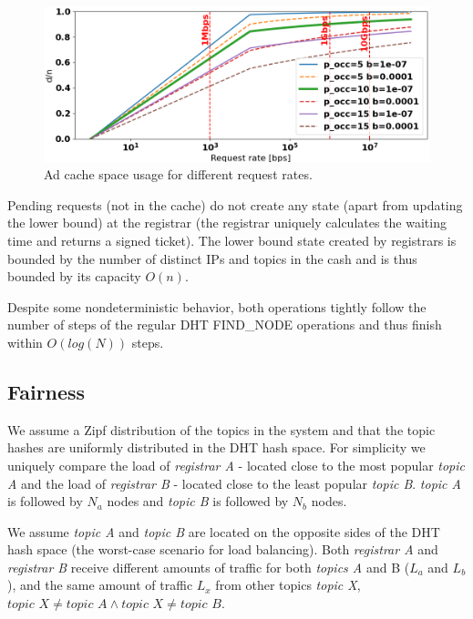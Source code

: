 \begin{figure}[t]
    \includegraphics[width=1\linewidth]{img/cache_size_limit}
    \vspace{-0.10in}
    \caption{Ad cache space usage for different request rates.
    }
    \label{fig:cache_size_limit}
    \vspace{-0.15in}
\end{figure}
Pending requests (\ie not in the cache) do not create any state (apart from updating the lower bound) at the registrar (\ie the registrar uniquely calculates the waiting time and returns a signed ticket). The lower bound state created by registrars is bounded by the number of distinct IPs and topics in the cash and is thus bounded by its capacity $O(n)$.

Despite some nondeterministic behavior, both operations tightly follow the number of steps of the regular DHT FIND\_NODE operations and thus finish within $O(log(N))$ steps.

\subsection{Fairness}
We assume a Zipf distribution of the topics in the system and that the topic hashes are uniformly distributed in the DHT hash space. For simplicity we uniquely compare the load of \emph{registrar A} - located close to the most popular \emph{topic A} and the load of \emph{registrar B} - located close to the least popular \emph{topic B}. \emph{topic A} is followed by $N_a$ nodes and \emph{topic B} is followed by $N_b$ nodes. 

We assume \emph{topic A} and \emph{topic B} are located on the opposite sides of the DHT hash space (the worst-case scenario for load balancing). Both \emph{registrar A} and \emph{registrar B} receive different amounts of traffic for both \emph{topics A} and {B} ($L_a$ and $L_b$), and the same amount of traffic $L_x$ from other topics \emph{topic X}, $\textit{topic X} \neq \textit{topic A} \land  \textit{topic X} \neq \textit{topic B}$. 

